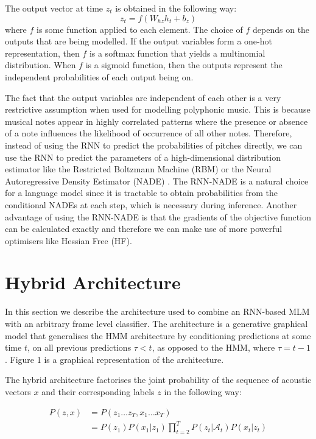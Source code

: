 \documentclass{article}
\begin{document}
The output vector at time $z_t$ is obtained in the following way:
\begin{equation}
 z_t = f(W_{hz}h_t + b_z)
\end{equation} where $f$ is some function applied to each element. The choice of $f$ depends on the outputs that are being modelled. If the output variables form a one-hot representation, then $f$ is a softmax function that yields a multinomial distribution. When $f$ is a sigmoid function, then the outputs represent the independent probabilities of each output being on. 

The fact that the output variables are independent of each other is a very restrictive assumption when used for modelling polyphonic music. This is because musical notes appear in highly correlated patterns where the presence or absence of a note influences the likelihood of occurrence of all other notes. Therefore, instead of using the RNN to predict the probabilities of pitches directly, we can use the RNN to predict the parameters of a high-dimensional distribution estimator like the Restricted Boltzmann Machine (RBM) or the Neural Autoregressive Density Estimator (NADE) \cite{boulanger2012modeling}. The RNN-NADE is a natural choice for a language model since it is tractable to obtain probabilities from the conditional NADEs at each step, which is necessary during inference. Another advantage of using the RNN-NADE is that the gradients of the objective function can be calculated exactly and therefore we can make use of more powerful optimisers like Hessian Free (HF).  


\section{Hybrid Architecture}

In this section we describe the architecture used to combine an RNN-based MLM with an arbitrary frame level classifier. The architecture is a generative graphical model that generalises the HMM architecture by conditioning predictions at some time $t$, on all previous predictions $\tau < t$, as opposed to the HMM, where $\tau = t-1$. Figure 1 is a graphical representation of the architecture. 


The hybrid architecture factorises the joint probability of the sequence of acoustic vectors $x$ and their corresponding labels $z$ in the following way:

\begin{align}
 P(z,x) &= P(z_{1} \ldots z_{T} , x_{1} \ldots x_{T}) \\ 
  &= P(z_1)P(x_{1}|z_1) \prod_{t=2}^{T} P(z_t|\mathcal{A}_t) P(x_t|z_t) \\ \nonumber
\end{align}
\end{document}
